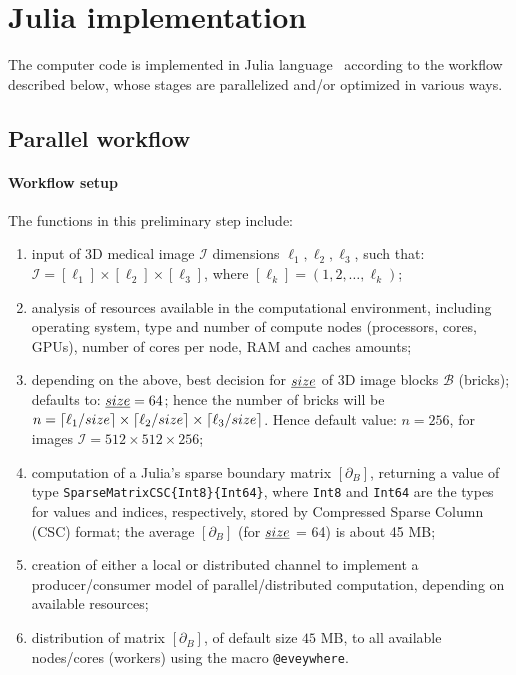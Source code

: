 

\section{Julia implementation}\label{sec:implementation}

The computer code is implemented in Julia language~\cite{} according to the workflow described below, whose stages are parallelized and/or optimized in various ways.

\subsection{Parallel workflow}\label{sec:implementation}


\paragraph{Workflow setup} The functions in this preliminary step include:
\begin{enumerate}

\item input of 3D medical image $\mathcal{I}$ dimensions $\ell_1, \ell_2, \ell_3$, such that: $\mathcal{I} = [\ell_1]\times[\ell_2]\times[\ell_3]$, where $[\ell_k] = (1,2,\ldots,\ell_k)$;

\item analysis of resources available in the computational environment, including operating system, type and number of compute nodes (processors, cores, GPUs), number of cores per node, RAM and caches amounts;

\item depending on the above, best decision for $\emph{size}$ of 3D image blocks $\mathcal{B}$ (bricks); defaults to: $\emph{size}=64$; hence the number of bricks will be $n=\left\lceil \ell_1/size \right\rceil\times\left\lceil \ell_2/size \right\rceil\times\left\lceil \ell_3/size \right\rceil$. 
Hence default value: $n=256$, for images $\mathcal{I} = 512\times 512\times 256$;

\item computation of a Julia's sparse boundary matrix $[\partial_B]$, returning a value of type \texttt{SparseMatrixCSC\{Int8\}\{Int64\}}, where \texttt{Int8} and \texttt{Int64} are the types for values and indices, respectively, stored by Compressed Sparse Column (CSC) format; the average $[\partial_B]$ (for $\emph{size}$ = 64) is about 45 MB;

\item creation of either a local or distributed channel to implement a producer/consumer model of parallel/distributed computation, depending on available resources;

\item distribution of matrix $[\partial_B]$, of default size $45$ MB, to all available nodes/cores (workers) using the macro \texttt{@eveywhere}. 

\end{enumerate}

